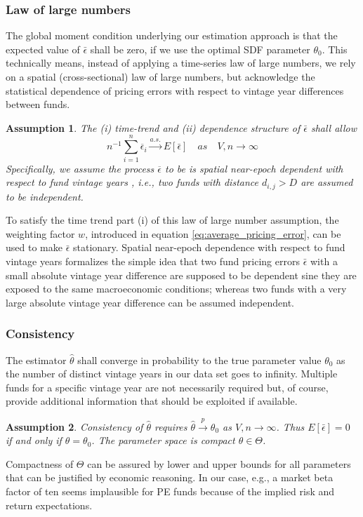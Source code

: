 \documentclass[12pt]{article}
\newtheorem{assume}{Assumption}
\begin{document}
\subsubsection{Law of large numbers}
The global moment condition underlying our estimation approach is that the expected value of $\bar{\epsilon}$ shall be zero, if we use the optimal SDF parameter $\theta_0$. 
This technically means, instead of applying a time-series law of large numbers, we rely on a spatial (cross-sectional) law of large numbers, but acknowledge the statistical dependence of  pricing errors with respect to vintage year differences between funds.

\begin{assume}
	\label{as:lln}
	The (i) time-trend and (ii) dependence structure of $\bar{\epsilon}$ shall allow
	\[
	n^{-1} \sum_{i=1}^n \overline{\epsilon}_i \overset{a.s.}\to E[\bar{\epsilon}]
	\quad {as} \quad V,n \to \infty
	\]
	Specifically, we assume the process $\overline{\epsilon}$ to be is spatial near-epoch dependent with respect to fund vintage years \citep{JP12}, i.e., two funds with distance $d_{i,j}>D$ are assumed to be independent.
\end{assume}
To satisfy the time trend part (i) of this law of large number assumption, the weighting factor $w$, introduced in equation \ref{eq:average_pricing_error}, can be used to make $\bar{\epsilon}$ stationary.
Spatial near-epoch dependence with respect to fund vintage years formalizes the simple idea that two fund pricing errors $\bar{\epsilon}$ with a small absolute vintage year difference are supposed to be dependent sine they are exposed to the same macroeconomic conditions; whereas two funds with a very large absolute vintage year difference can be assumed independent.

\subsubsection{Consistency}
The estimator $\hat{\theta}$ shall converge in probability to the true parameter value $\theta_0$ as the number of distinct vintage years in our data set goes to infinity.
Multiple funds for a specific vintage year are not necessarily required but, of course, provide additional information that should be exploited if available.

\begin{assume}
\label{as:consistency}
 Consistency of $\hat{\theta}$ requires $\hat{\theta} \overset{p}{\to} \theta_0$ as $V,n \to \infty$.
 Thus $E[\bar{\epsilon}]=0$ if and only if $\theta=\theta_0$.
 The parameter space is compact $\theta \in \Theta$.
\end{assume}
Compactness of $\Theta$ can be assured by lower and upper bounds for all parameters that can be justified by economic reasoning. In our case, e.g., a market beta factor of ten seems implausible for PE funds because of the implied risk and return expectations.
\end{document}
